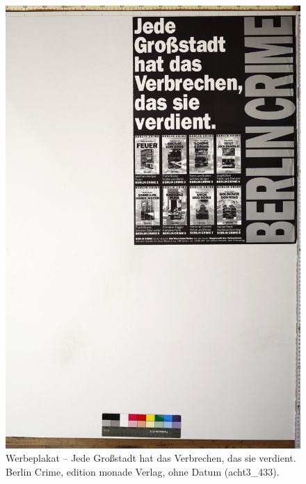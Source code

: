 \documentclass[a4paper,12pt,ngerman]{article}
\begin{document}
\newpage
\begin{figure}[ht]
\includegraphics[width=\linewidth]{Abbildung_42_(acht3_433)}
\centering
\caption{Werbeplakat – Jede Großstadt hat das Verbrechen, das sie verdient. Berlin Crime, edition monade Verlag, ohne Datum (acht3\_433).}
\end{figure}
\end{document}
